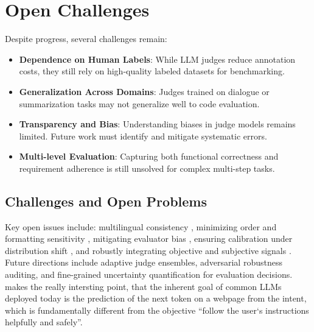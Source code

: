 \section{Open Challenges}
Despite progress, several challenges remain:

\begin{itemize}
    \item \textbf{Dependence on Human Labels}: While LLM judges reduce annotation costs, they still rely on high-quality labeled datasets for benchmarking.
    \item \textbf{Generalization Across Domains}: Judges trained on dialogue or summarization tasks may not generalize well to code evaluation.
    \item \textbf{Transparency and Bias}: Understanding biases in judge models remains limited. Future work must identify and mitigate systematic errors.
    \item \textbf{Multi-level Evaluation}: Capturing both functional correctness and requirement adherence is still unsolved for complex multi-step tasks.
\end{itemize}


\subsection{Challenges and Open Problems}
Key open issues include: multilingual consistency \cite{hada2024metal}, minimizing order and formatting sensitivity \cite{zheng2023judgelm}, mitigating evaluator bias \cite{liang2022helm}, ensuring calibration under distribution shift \cite{bavaresco2024judgebench}, and robustly integrating objective and subjective signals \cite{chen2021evaluating, li2024_llmsasjudges}. Future directions include adaptive judge ensembles, adversarial robustness auditing, and fine-grained uncertainty quantification for evaluation decisions. \cite{ouyang2022training} makes the really intersting point, that the inherent goal of common LLMs deployed today is the prediction of the next token on a webpage from the intent, which is fundamentally different from the objective “follow the user`s instructions helpfully and safely”.